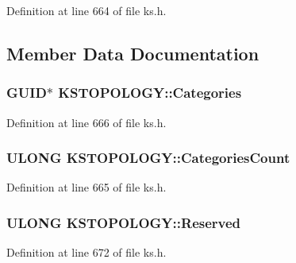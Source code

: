Definition at line 664 of file ks.\+h.



\subsection{Member Data Documentation}
\subsubsection[{\texorpdfstring{Categories}{Categories}}]{ G\+U\+ID$\ast$ K\+S\+T\+O\+P\+O\+L\+O\+G\+Y\+::\+Categories}\hypertarget{struct_k_s_t_o_p_o_l_o_g_y_a0105bf417c36888ea1b0862692054bba}{}\label{struct_k_s_t_o_p_o_l_o_g_y_a0105bf417c36888ea1b0862692054bba}


Definition at line 666 of file ks.\+h.

\subsubsection[{\texorpdfstring{Categories\+Count}{CategoriesCount}}]{\setlength{\rightskip}{0pt plus 5cm}U\+L\+O\+NG K\+S\+T\+O\+P\+O\+L\+O\+G\+Y\+::\+Categories\+Count}\hypertarget{struct_k_s_t_o_p_o_l_o_g_y_a43683fc683ee214878205240774f0ae8}{}\label{struct_k_s_t_o_p_o_l_o_g_y_a43683fc683ee214878205240774f0ae8}


Definition at line 665 of file ks.\+h.

\subsubsection[{\texorpdfstring{Reserved}{Reserved}}]{\setlength{\rightskip}{0pt plus 5cm}U\+L\+O\+NG K\+S\+T\+O\+P\+O\+L\+O\+G\+Y\+::\+Reserved}\hypertarget{struct_k_s_t_o_p_o_l_o_g_y_a800a4e9385fc04d3a5554b6a523c16a3}{}\label{struct_k_s_t_o_p_o_l_o_g_y_a800a4e9385fc04d3a5554b6a523c16a3}


Definition at line 672 of file ks.\+h.

